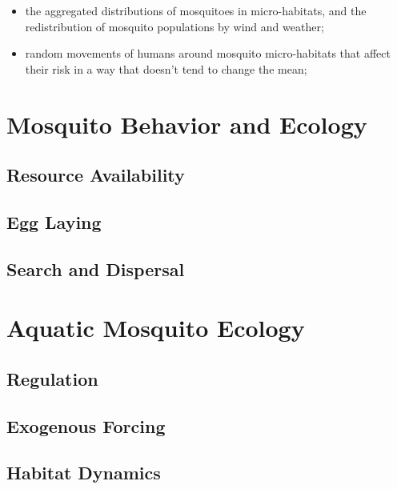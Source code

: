 \documentclass[
]{book}
\begin{document}
\begin{itemize}
\item
  the aggregated distributions of mosquitoes in micro-habitats, and the redistribution of mosquito populations by wind and weather;
\item
  random movements of humans around mosquito micro-habitats that affect their risk in a way that doesn't tend to change the mean;
\end{itemize}

\hypertarget{mosquito-behavior-and-ecology}{%
\section{Mosquito Behavior and Ecology}\label{mosquito-behavior-and-ecology}}

\hypertarget{resource-availability}{%
\subsection{Resource Availability}\label{resource-availability}}

\hypertarget{egg-laying}{%
\subsection{Egg Laying}\label{egg-laying}}

\hypertarget{search-and-dispersal}{%
\subsection{Search and Dispersal}\label{search-and-dispersal}}

\hypertarget{aquatic-mosquito-ecology}{%
\section{Aquatic Mosquito Ecology}\label{aquatic-mosquito-ecology}}

\hypertarget{regulation}{%
\subsection{Regulation}\label{regulation}}

\hypertarget{exogenous-forcing}{%
\subsection{Exogenous Forcing}\label{exogenous-forcing}}

\hypertarget{habitat-dynamics}{%
\subsection{Habitat Dynamics}\label{habitat-dynamics}}
\end{document}
